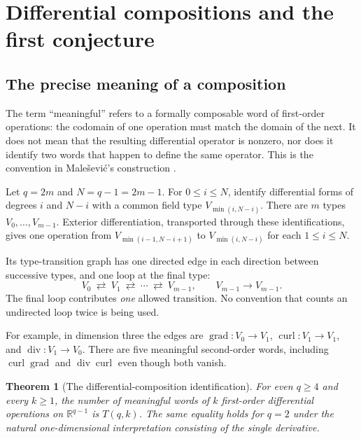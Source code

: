 \documentclass[11pt,letterpaper]{article}
\numberwithin{equation}{section}
\newtheorem{theorem}{Theorem}[section]
\theoremstyle{definition}
\newcommand{\R}{\mathbb R}
\begin{document}
\section{Differential compositions and the first conjecture}
\label{sec:differential}

\subsection{The precise meaning of a composition}
The term ``meaningful'' refers to a formally composable word of
first-order operations: the codomain of one operation must match the
domain of the next.  It does not mean that the resulting differential
operator is nonzero, nor does it identify two words that happen to define
the same operator.  This is the convention in Male\v sevi\'c's
construction \cite{mal}.

Let $q=2m$ and $N=q-1=2m-1$.  For $0\le i\le N$, identify differential
forms of degrees $i$ and $N-i$ with a common field type
$V_{\min(i,N-i)}$.  There are $m$ types $V_0,\ldots,V_{m-1}$.
Exterior differentiation, transported through these identifications,
gives one operation from $V_{\min(i-1,N-i+1)}$ to
$V_{\min(i,N-i)}$ for each $1\le i\le N$.

Its type-transition graph has one directed edge in each direction
between successive types, and one loop at the final type:
\[
V_0\ \rightleftarrows\ V_1\ \rightleftarrows\ \cdots\
\rightleftarrows\ V_{m-1},
\qquad V_{m-1}\longrightarrow V_{m-1}.
\]
The final loop contributes \emph{one} allowed transition.  No convention
that counts an undirected loop twice is being used.

For example, in dimension three the edges are
$\operatorname{grad}:V_0\to V_1$,
$\operatorname{curl}:V_1\to V_1$, and
$\operatorname{div}:V_1\to V_0$.
There are five meaningful second-order words, including
$\operatorname{curl}\operatorname{grad}$ and
$\operatorname{div}\operatorname{curl}$ even though both vanish.

\begin{theorem}[The differential-composition identification]\label{thm:differential}
For even $q\ge4$ and every $k\ge1$, the number of meaningful words of
$k$ first-order differential operations on $\R^{q-1}$ is $T(q,k)$.
The same equality holds for $q=2$ under the natural one-dimensional
interpretation consisting of the single derivative.
\end{theorem}
\end{document}
